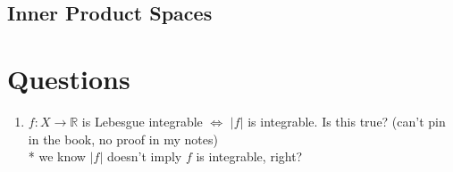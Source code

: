 \documentclass[a4paper, 12pt]{article}
\def\R{\ensuremath{\mathbb{R}}} %
\begin{document}
\begin{multicols}{2}
\subsection{Inner Product Spaces}
\section{Questions}
\begin{enumerate}
    \item $f: X \rightarrow \R$ is Lebesgue integrable $\iff$ $|f|$ is integrable. Is this true? (can't pin in the book, no proof in my notes) \\
    * we know $|f|$ doesn't imply $f$ is integrable, right?

\end{enumerate}



\end{multicols}
\end{document}
